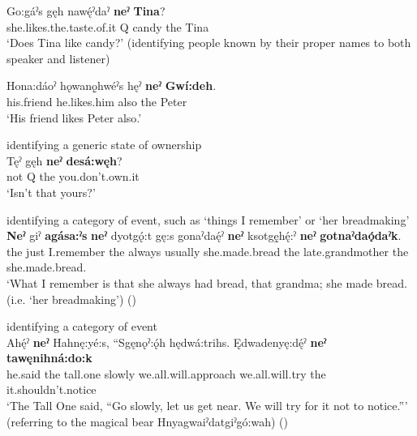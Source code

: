 \ea
\label{ex:npar5}
\gll Go:gáˀs gęh nawę́ˀdaˀ \textbf{neˀ} \textbf{Tina}?\\
she.likes.the.taste.of.it Q candy the Tina\\
\glt ‘Does Tina like candy?’ (identifying people known by their proper names to both speaker and listener)
\z

\ea
\label{ex:npar6}
\gll Hona:dáoˀ hǫwanǫ̱hwéˀs hęˀ \textbf{neˀ} \textbf{Gwí:deh}.\\
his.friend he.likes.him also the Peter\\
\glt ‘His friend likes Peter also.’
\z

\ea identifying a generic state of ownership\\
\label{ex:npar7}
\gll
Tęˀ gęh \textbf{neˀ} \textbf{desá:węh}?\\
not Q the you.don’t.own.it\\
\glt ‘Isn’t that yours?’ 
\z

\ea identifying a category of event, such as ‘things I remember’ or ‘her breadmaking’\\
\label{ex:npar8}
\gll \textbf{Neˀ} giˀ \textbf{agása:ˀs} \textbf{neˀ} dyotgǫ́:t gę:s gonaˀdaę́ˀ \textbf{neˀ} ksotgę̱hę́:ˀ \textbf{neˀ} \textbf{gotnaˀdaǫ́daˀk}.\\
the just I.remember the always usually she.made.bread the late.grandmother the she.made.bread.\\
\glt ‘What I remember is that she always had bread, that grandma; she made bread. (i.e. ‘her breadmaking’) (\cite{henry_de_2005}) 
\z

\ea
\label{ex:npar9} identifying a category of event\\
\gll Ahę́ˀ \textbf{neˀ} Hahnę:yé:s, “Sgęnǫˀ:ǫ́h hędwá:trihs. Ędwadenyę:dę́ˀ \textbf{neˀ} \textbf{tawęnihná:do:k}\\
he.said the tall.one slowly we.all.will.approach we.all.will.try the it.shouldn’t.notice\\
\glt ‘The Tall One said, “Go slowly, let us get near. We will try for it not to notice.”’ (referring to the magical bear Hnyagwaiˀdatgiˀgó:wah) (\cite{keye_hnyagwaidatgigowah_2012})
\z





